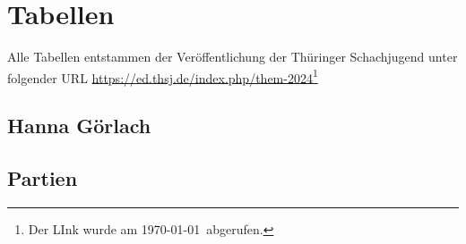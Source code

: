 \documentclass[a4paper,ngerman]{tui-algo-seminar}
\title{\inhalt}
\author{Erik Skopp}
\newcommand{\inhalt}{Thüringer Einzelmeisterschaft 2024}
\begin{document}
\maketitle
\thispagestyle{plain}
\begin{abstract}
    Bericht: \inhalt.\\
    Das erste Nikolaus Blitzturnier des Ilmenauer Schachvereins fand am 08.12.2023 statt. Es wurden 13 Runden mit einer Bedenkzeit von 5 Minuten gespielt. Platz 1 erreichte Andreas Neubauer von BW Stadtilm. Platz 2 ging an Pascal Eichenauer. Platz 3 ging an Ainur Ziganshin.
\end{abstract}



\section{Tabellen}
Alle Tabellen entstammen der Veröffentlichung der Thüringer Schachjugend unter folgender URL \url{https://ed.thsj.de/index.php/them-2024}\footnote{Der LInk wurde am \today ~abgerufen.}

\subsection{Hanna Görlach}
\subsection{Partien}

\end{document}
